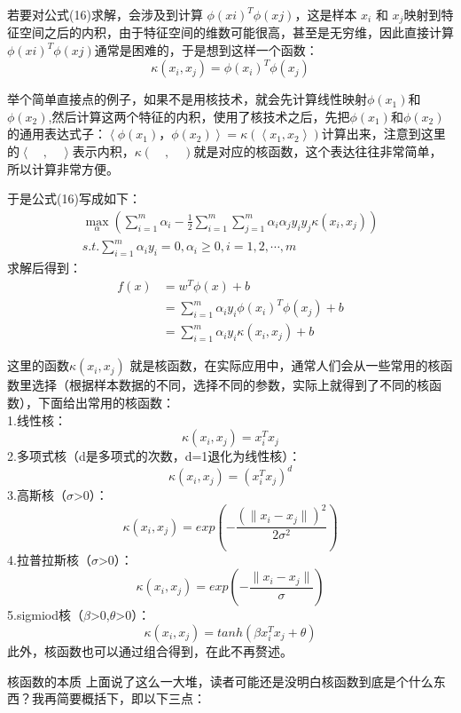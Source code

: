 \documentclass[UTF8]{article}
\begin{document}
若要对公式(16)求解，会涉及到计算 $\phi(xi)^T\phi(xj)$，这是样本 $x_i$ 和 $x_j$映射到特征空间之后的内积，由于特征空间的维数可能很高，甚至是无穷维，因此直接计算 $\phi(xi)^T\phi(xj)$通常是困难的，于是想到这样一个函数：
\begin{equation}
\kappa(x_i,x_j) = \phi(x_i)^T \phi(x_j)
\end{equation}


举个简单直接点的例子，如果不是用核技术，就会先计算线性映射$\phi(x_1)$和$\phi(x_2)$,然后计算这两个特征的内积，使用了核技术之后，先把$\phi(x_1)$和$\phi(x_2)$的通用表达式子：$\left\langle\phi(x_1)，\phi(x_2)\right\rangle=\kappa(\left\langle x_1,x_2\right\rangle)$计算出来，注意到这里的$\left\langle\quad,\quad\right\rangle$表示内积，$\kappa(\quad,\quad)$就是对应的核函数，这个表达往往非常简单，所以计算非常方便。

于是公式(16)写成如下：
\begin{equation}
\begin{split}
\max\limits_{\alpha}\left(\sum\limits_{i=1}^m\alpha_i-\frac{1}{2}\sum\limits_{i=1}^m\sum\limits_{j=1}^m\alpha_i\alpha_j y_i y_j \kappa(x_i,x_j)\right)\\
s.t.\sum\limits_{i=1}^m\alpha_i y_i= 0,\alpha_i\ge 0,i = 1,2,\cdots,m
\end{split}
\end{equation}
求解后得到：
\begin{equation}
\begin{split}
f(x)& = w^T\phi(x)+b\\
&=\sum\limits_{i = 1}^m\alpha_iy_i\phi(x_i)^T\phi(x_j)+b\\
&=\sum\limits_{i = 1}^m\alpha_iy_i\kappa(x_i,x_j)+b
\end{split}
\end{equation}

这里的函数$\kappa(x_i,x_j)$ 就是核函数，在实际应用中，通常人们会从一些常用的核函数里选择（根据样本数据的不同，选择不同的参数，实际上就得到了不同的核函数），下面给出常用的核函数：\\
1.线性核：
$$\kappa(x_i,x_j)=x_i^Tx_j$$
2.多项式核（d是多项式的次数，d=1退化为线性核）：
$$\kappa(x_i,x_j)=(x_i^Tx_j)^d$$ 
3.高斯核（$\sigma$>0）：
$$\kappa(x_i,x_j)=exp{(-\frac{(\lVert x_i-x_j\rVert)^2}{2\sigma^2})}$$ 
4.拉普拉斯核（$\sigma$>0）：
$$\kappa(x_i,x_j)=exp{(-\frac{\lVert x_i-x_j\rVert}{\sigma})}$$ 
5.sigmiod核（$\beta$>0,$\theta$>0）：
$$\kappa(x_i,x_j)=tanh(\beta x_i^Tx_j+\theta)$$
此外，核函数也可以通过组合得到，在此不再赘述。
 
核函数的本质
上面说了这么一大堆，读者可能还是没明白核函数到底是个什么东西？我再简要概括下，即以下三点：
\end{document}

